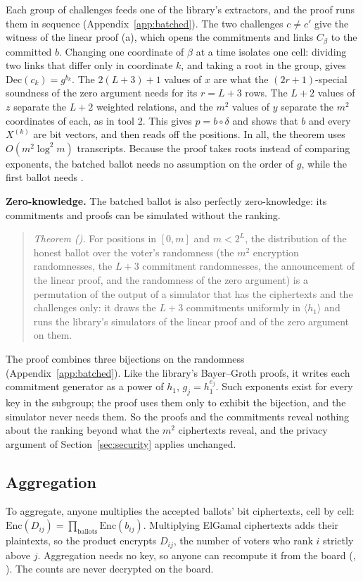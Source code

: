Each group of challenges feeds one of the library's extractors, and the
proof runs them in sequence (Appendix~\ref{app:batched}). The two
challenges $c \ne c'$ give the witness of the linear proof (a), which
opens the commitments and links $C_\beta$ to the committed $b$. Changing
one coordinate of $\beta$ at a time isolates one cell: dividing two links
that differ only in coordinate $k$, and taking a root in the group,
gives $\mathrm{Dec}(c_k) = g^{b_k}$. The $2(L+3)+1$ values of $x$ are
what the $(2r{+}1)$-special soundness of the zero argument needs for its
$r = L + 3$ rows. The $L + 2$ values of $z$ separate the $L + 2$ weighted
relations, and the $m^2$ values of $y$ separate the $m^2$ coordinates of
each, as in tool 2. This gives $p = b \circ \delta$ and shows that $b$
and every $X^{(k)}$ are bit vectors, and  then
reads off the positions. In all, the theorem uses $O(m^2 \log^2 m)$
transcripts. Because the proof takes roots
instead of comparing exponents, the batched ballot needs no assumption
on the order of $g$, while the first ballot needs .

\textbf{Zero-knowledge.} The batched ballot is also perfectly
zero-knowledge: its commitments and proofs can be simulated without the
ranking.
\begin{quote}
  \emph{Theorem ().} For positions in $[0,m]$ and
  $m < 2^L$, the distribution of the honest ballot over the voter's
  randomness (the $m^2$ encryption randomnesses, the $L + 3$ commitment
  randomnesses, the announcement of the linear proof, and the randomness
  of the zero argument) is a permutation of the output of a
  simulator that has the ciphertexts and the challenges only: it draws
  the $L + 3$ commitments uniformly in $\langle h_1\rangle$ and runs the
  library's simulators of the linear proof and of the zero argument on
  them.
\end{quote}
The proof combines three bijections on the randomness
(Appendix~\ref{app:batched}). Like the library's Bayer--Groth proofs,
it writes each commitment generator as a power of $h_1$, $g_j =
h_1^{e_j}$. Such exponents exist for every key in the subgroup; the
proof uses them only to exhibit the bijection, and the simulator never
needs them. So the proofs and the commitments reveal nothing about the
ranking beyond what the $m^2$ ciphertexts reveal, and the
privacy argument of Section~\ref{sec:security} applies unchanged.


\subsection{Aggregation}\label{sec:aggregation}
To aggregate, anyone multiplies the accepted ballots' bit ciphertexts,
cell by cell: $\mathrm{Enc}(D_{ij}) = \prod_{\text{ballots}}
\mathrm{Enc}(b_{ij})$. Multiplying ElGamal ciphertexts adds their
plaintexts, so the product encrypts $D_{ij}$, the number of voters who
rank $i$ strictly above $j$. Aggregation needs no key, so anyone can
recompute it from the board (,
). The counts are never decrypted on the
board.

